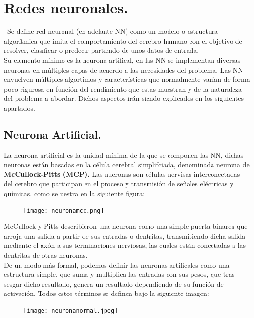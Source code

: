 \documentclass[a4paper,10pt]{article}
\begin{document}
\section{Redes neuronales.}
\
Se define red neuronal (en adelante NN) como un modelo o estructura algorítmica que imita el comportamiento del cerebro humano con el objetivo de resolver, clasificar o predecir partiendo de unos datos de entrada.\\
Su elemento mínimo es la neurona artifical, en las NN se implementan diversas neuronas en múltiples capas de acuerdo a las necesidades del problema.
Las NN envuelven múltiples algortimos y características que normalmente varían de forma poco rigurosa en función del rendimiento que estas muestran y de la naturaleza del problema a abordar. Dichos aspectos irán siendo explicados en los siguientes apartados.
\subsection{Neurona Artificial.}
La neurona artificial es la unidad mínima de la que se componen las NN, dichas neuronas están basadas en la célula cerebral simplifciada, denominada neurona de \textbf{McCullock-Pitts (MCP).} Las nueronas son células nervisas interconectadas del cerebro que participan en el proceso y transmisión de señales eléctricas y químicas, como se uestra en la siguiente figura: \\
\begin{figure}[H]
\centering
\texttt{[image: neuronamcc.png]}
\end{figure}
\noindent
McCullock y Pitts describieron una neurona como una simple puerta binarea que arroja una salida a partir de sus entradas o dentritas, transmitiendo dicha salida mediante el axón a sus terminaciones nerviosas, las cuales están concetadas a las dentritas de otras neuronas.\\
De un modo más formal, podemos definir las neuronas artificales como una estructura simple, que suma y multiplica las entradas con sus pesos, que tras sesgar dicho resultado, genera un resultado dependiendo de su función de activación. Todos estos términos se definen bajo la siguiente imagen:
\begin{figure}[H]
\centering
\texttt{[image: neuronanormal.jpeg]}
\end{figure}
\end{document}
